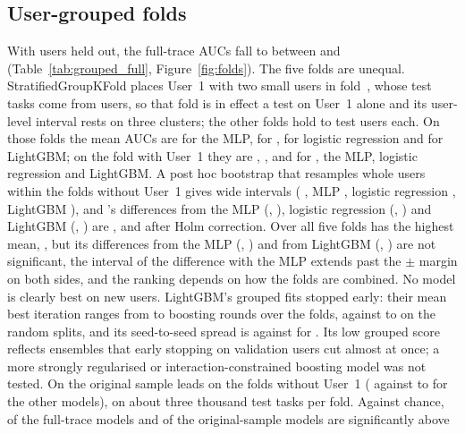 \subsection{User-grouped folds}
\label{sec:res-grouped}

With users held out, the full-trace AUCs fall to between  and  (Table~\ref{tab:grouped_full}, Figure~\ref{fig:folds}). The five folds are unequal. StratifiedGroupKFold places User~1 with two small users in fold~, whose  test tasks come from  users, so that fold is in effect a test on User~1 alone and its user-level interval rests on three clusters; the other folds hold  to  test users each. On those  folds the mean AUCs are  for the MLP,  for \kaam{},  for logistic regression and  for LightGBM; on the fold with User~1 they are , ,  and  for \kaam{}, the MLP, logistic regression and LightGBM. A post hoc bootstrap that resamples whole users within the  folds without User~1 gives wide intervals (\kaam{} , MLP , logistic regression , LightGBM ), and \kaam{}'s differences from the MLP (, ), logistic regression (, ) and LightGBM (, ) are ,  and  after Holm correction. Over all five folds \kaam{} has the highest mean,  , but its differences from the MLP (, ) and from LightGBM (, ) are not significant, the interval of the difference with the MLP extends past the $\pm$ margin on both sides, and the ranking depends on how the folds are combined. No model is clearly best on new users. LightGBM's grouped fits stopped early: their mean best iteration ranges from  to  boosting rounds over the folds, against  to  on the random splits, and its seed-to-seed spread is  against  for \kaam{}. Its low grouped score reflects ensembles that early stopping on validation users cut almost at once; a more strongly regularised or interaction-constrained boosting model was not tested. On the original sample \kaam{} leads on the  folds without User~1 ( against  to  for the other models), on about three thousand test tasks per fold. Against chance,  of the  full-trace models and  of the  original-sample models are significantly above 